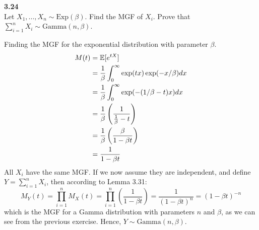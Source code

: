 \bigskip\noindent
\textbf{3.24}\\  %
Let $X_1,\ldots, X_n\sim\text{Exp}(\beta)$. Find the MGF of $X_i$. Prove that
$\sum_{i=1}^n X_i\sim \text{Gamma}(n, \beta)$.

\medskip\noindent Finding the MGF for the exponential distribution with parameter $\beta$.
\begin{align*}
    M(t) &= \mathbb{E}[e^{tX}] \\
    &= \frac{1}{\beta}\int_{0}^\infty\exp(tx)\exp(-x/\beta)dx \\
    &= \frac{1}{\beta}\int_{0}^\infty\exp(-(1/\beta - t)x)dx \\
    &= \frac{1}{\beta}\left(\frac{1}{\frac{1}{\beta} - t}\right) \\
    &= \frac{1}{\beta}\left(\frac{\beta}{1 - \beta t}\right) \\
    &= \frac{1}{1 - \beta t}
\end{align*}
All $X_i$ have the same MGF. If we now assume they are independent, and define
$Y = \sum_{i=1}^n X_i$, then according to Lemma 3.31:
$$
M_Y(t) = \prod_{i=1}^n M_X(t) = \prod_{i=1}^n\left(\frac{1}{1 - \beta t}\right)
= \frac{1}{(1 - \beta t)^n} = (1 - \beta t)^{-n}
$$
which is the MGF for a Gamma distribution with parameters $n$ and $\beta$, as we can see
from the previous exercise. Hence, $Y\sim\text{Gamma}(n, \beta)$.








